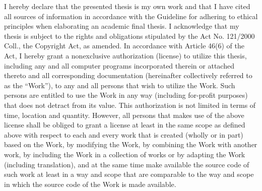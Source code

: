 \documentclass[english,master,unicode,oneside]{ctufit-thesis}
\theoremstyle{plain}
\theoremstyle{definition}
\theoremstyle{remark}
\numberwithin{theorem}{chapter}
\begin{document}
    \begin{declarationpage}
        I hereby declare that the presented thesis is my own work and that I have cited all
        sources of information in accordance with the Guideline for adhering to ethical
        principles when elaborating an academic final thesis.
        I acknowledge that my thesis is subject to the rights and obligations stipulated by the
        Act No. 121/2000 Coll., the Copyright Act, as amended.
        In accordance with Article 46(6)
        of the Act, I hereby grant a nonexclusive authorization (license) to utilize this thesis,
        including any and all computer programs incorporated therein or attached thereto and
        all corresponding documentation (hereinafter collectively referred to as the “Work”), to
        any and all persons that wish to utilize the Work.
        Such persons are entitled to use the
        Work in any way (including for-profit purposes) that does not detract from its value.
        This authorization is not limited in terms of time, location and quantity.
        However, all
        persons that makes use of the above license shall be obliged to grant a license at least
        in the same scope as defined above with respect to each and every work that is created
        (wholly or in part) based on the Work, by modifying the Work, by combining the Work
        with another work, by including the Work in a collection of works or by adapting the
        Work (including translation), and at the same time make available the source code of
        such work at least in a way and scope that are comparable to the way and scope in
        which the source code of the Work is made available.
    \end{declarationpage}

    \printabstractpage %
\end{document}
